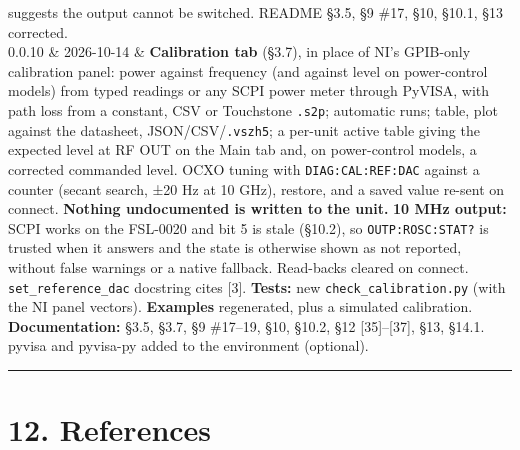\documentclass[
\directlua{luaotfload.add_fallback("qsfallback", {"DejaVu Sans:mode=harf;", "DejaVu Sans Mono:mode=harf;", "DejaVu Math TeX Gyre:mode=harf;"})}
  10pt,
  letterpaper,
]{article}
\begin{document}
\begin{longtable}[]
suggests the output cannot be switched. README §3.5, §9 \#17, §10,
§10.1, §13 corrected. \\
0.0.10 & 2026-10-14 & \textbf{Calibration tab} (§3.7), in place of NI's
GPIB-only calibration panel: power against frequency (and against level
on power-control models) from typed readings or any SCPI power meter
through PyVISA, with path loss from a constant, CSV or Touchstone
\texttt{.s2p}; automatic runs; table, plot against the datasheet,
JSON/CSV/\texttt{.vszh5}; a per-unit active table giving the expected
level at RF OUT on the Main tab and, on power-control models, a
corrected commanded level. OCXO tuning with \texttt{DIAG:CAL:REF:DAC}
against a counter (secant search, ±20 Hz at 10 GHz), restore, and a
saved value re-sent on connect. \textbf{Nothing undocumented is written
to the unit.} \textbf{10 MHz output:} SCPI works on the FSL-0020 and bit
5 is stale (§10.2), so \texttt{OUTP:ROSC:STAT?} is trusted when it
answers and the state is otherwise shown as not reported, without false
warnings or a native fallback. Read-backs cleared on connect.
\texttt{set\_reference\_dac} docstring cites {[}3{]}. \textbf{Tests:}
new \texttt{check\_calibration.py} (with the NI panel vectors).
\textbf{Examples} regenerated, plus a simulated calibration.
\textbf{Documentation:} §3.5, §3.7, §9 \#17--19, §10, §10.2, §12
{[}35{]}--{[}37{]}, §13, §14.1. pyvisa and pyvisa-py added to the
environment (optional). \\
\end{longtable}

\begin{center}\rule{0.5\linewidth}{0.5pt}\end{center}

\hypertarget{references}{%
\section{12. References}\label{references}}
\end{document}
